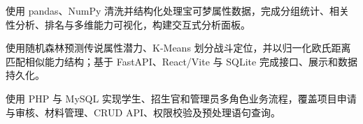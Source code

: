 
\begin{ResumeItemize}
  \item 使用 pandas、NumPy 清洗并结构化处理宝可梦属性数据，完成分组统计、相关性分析、排名与多维能力可视化，构建交互式分析面板。
  \item 使用随机森林预测传说属性潜力、K-Means 划分战斗定位，并以归一化欧氏距离匹配相似能力结构；基于 FastAPI、React/Vite 与 SQLite 完成接口、展示和数据持久化。
\end{ResumeItemize}

\begin{ResumeItemize}
  \item 使用 PHP 与 MySQL 实现学生、招生官和管理员多角色业务流程，覆盖项目申请与审核、材料管理、CRUD API、权限校验及预处理语句查询。
\end{ResumeItemize}
